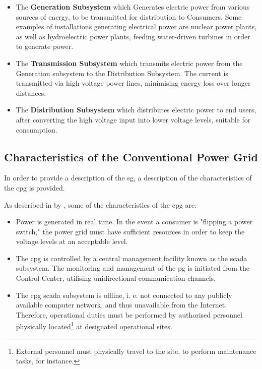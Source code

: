 \begin{itemize}

 \item The \textbf{Generation Subsystem} which Generates electric power from various sources of energy, to be transmitted for distribution to Consumers. Some examples of installations generating electrical power are nuclear power plants, as well as hydroelectric power plants, feeding water-driven turbines in order to generate power.
 \item The \textbf{Transmission Subsystem} which transmits electric power from the Generation subsystem to the Distribution Subsystem. The current is transmitted via high voltage power lines, minimising energy loss over longer distances.
 \item The \textbf{Distribution Subsystem} which distributes electric power to end users, after converting the high voltage input into lower voltage levels, suitable for consumption.
 \end{itemize}


\subsection{Characteristics of the Conventional Power Grid} \label{subsec:PG-char}


In order to provide a description of the \acrfull{sg}, a description of the characteristics of the \acrlong{cpg} is provided.

As described in  \cite{BlumeStevenW2007Epsb} by \citeauthor{BlumeStevenW2007Epsb}, some of the characteristics of the \acrlong{cpg} are:

\begin{itemize}
\item Power is generated in real time. In the event a consumer is "flipping a power switch," the power grid must have sufficient resources in order to keep the voltage levels at an acceptable level.
\item The \acrlong{cpg} is controlled by a central management facility known as the \acrfull{scada} subsystem. The monitoring and management of the \acrshort{pg} is initiated from the Control Center, utilising unidirectional communication channels. 
\item The \acrlong{cpg} \acrlong{scada} subsystem is offline, i. e. not connected to any publicly available computer network, and thus unavailable from the Internet. Therefore, operational duties must be performed by authorised personnel physically located\footnote{External personnel must physically travel to the site, to perform maintenance tasks, for instance.} at designated operational sites.

\end{itemize}

